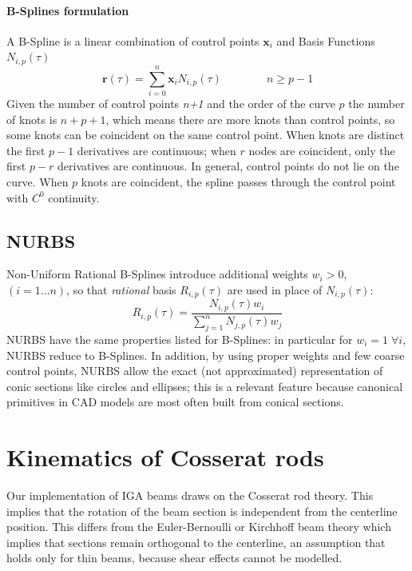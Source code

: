 \documentclass[review]{elsarticle}
\def\avect#1{{\boldsymbol{#1}}}
\begin{document}
\paragraph{B-Splines formulation} A B-Spline is a linear combination of control points $\avect{x}_i$ and Basis Functions $N_{i,p}(\tau)$
\begin{equation}
\label{eq:BSpline}
\avect{r}(\tau) = \sum_{i=0}^n \avect{x}_i N_{i,p}(\tau) \qquad\qquad n \geq p-1
\end{equation}
Given the number of control points \emph{n+1} and the order of the curve $p$ the number of knots is $n+p+1$, which means there are more knots than control points, so some knots can be coincident on the same control point. When knots are distinct the first $p-1$ derivatives are continuous; when $r$ nodes are coincident, only the first $p-r$ derivatives are continuous. In general, control points do not lie on the curve. When $p$ knots are coincident, the spline passes through the control point with $C^0$ continuity.


\subsection{NURBS}

Non-Uniform Rational B-Splines introduce additional weights ${w_i}>0$, $(i = 1...n)$, so that \emph{rational} basis $R_{i,p}(\tau)$ are used in place of $N_{i,p}(\tau)$:
\begin{equation}
\label{eq:NURBS_Basis}
R_{i,p}(\tau) = \frac{N_{i,p}(\tau)w_i}{\sum_{j=1}^n N_{j,p}(\tau)w_j}
\end{equation}
NURBS have the same properties listed for B-Splines: in particular for $w_i = 1 \; \forall i$, NURBS reduce to B-Splines. In addition, by using proper weights and few coarse control points, NURBS allow the exact (not approximated) representation of conic sections like circles and ellipses; this is a relevant feature because canonical primitives in CAD models are most often built from conical sections.


%
%




\section{Kinematics of Cosserat rods}

Our implementation of IGA beams draws on the Cosserat rod theory.
This implies that the rotation of the beam section is independent 
from the centerline position. This differs from the Euler-Bernoulli or
Kirchhoff beam theory which implies that sections remain orthogonal to the centerline,
an assumption that holds only for thin beams, because shear effects
cannot be modelled. 
\end{document}
